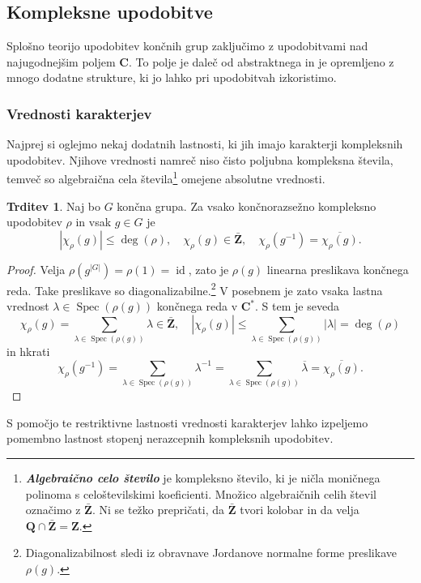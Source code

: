 \documentclass[11pt]{book}
\def\ZZ{\mathbf{Z}}
\def\QQ{\mathbf{Q}}
\def\CC{\mathbf{C}}
\DeclareMathOperator\Eigenvalues{Spec}
\DeclareMathOperator\id{id}
\def\definicija{\color{rdeca}\bf\em}
\theoremstyle{definition}
\theoremstyle{zgled}
\theoremstyle{odprtproblem}
\theoremstyle{domacanaloga}
\newenvironment{dokaz}
    {\color{siva}\begin{proof}}
    {\end{proof}}
\theoremstyle{izrek}
\newtheorem*{trditev}{Trditev}
\begin{document}
\subsection{Kompleksne upodobitve}

Splošno teorijo upodobitev končnih grup zaključimo z upodobitvami nad najugodnejšim poljem $\CC$. To polje je daleč od abstraktnega in je opremljeno z mnogo dodatne strukture, ki jo lahko pri upodobitvah izkoristimo.

\subsubsection{Vrednosti karakterjev}

Najprej si oglejmo nekaj dodatnih lastnosti, ki jih imajo karakterji kompleksnih upodobitev. Njihove vrednosti namreč niso čisto poljubna kompleksna števila, temveč so algebraična cela števila\footnote{{\definicija Algebraično celo število} je kompleksno število, ki je ničla moničnega polinoma s celoštevilskimi koeficienti. Množico algebraičnih celih števil označimo z $\bar{\ZZ}$. Ni se težko prepričati, da $\bar{\ZZ}$ tvori kolobar in da velja $\QQ \cap \bar{\ZZ} = \ZZ$.} omejene absolutne vrednosti. 

\begin{trditev}
Naj bo $G$ končna grupa. Za vsako končnorazsežno kompleksno upodobitev $\rho$ in vsak $g \in G$ je
\[
    |\chi_{\rho}(g)| \leq \deg(\rho), \quad
    \chi_{\rho}(g) \in \bar{\ZZ}, \quad
    \chi_{\rho}(g^{-1}) = \overline{\chi_{\rho}(g)}. 
\] 
\end{trditev}
\begin{dokaz}
Velja $\rho(g^{|G|}) = \rho(1) = \id$, zato je $\rho(g)$ linearna preslikava končnega reda. Take preslikave so diagonalizabilne.\footnote{Diagonalizabilnost sledi iz obravnave Jordanove normalne forme preslikave $\rho(g)$.} V posebnem je zato vsaka lastna vrednost $\lambda \in \Eigenvalues(\rho(g))$ končnega reda v $\CC^*$. S tem je seveda
\[
    \chi_{\rho}(g) = \sum_{\lambda \in \Eigenvalues(\rho(g))} \lambda \in \bar{\ZZ},
    \quad
    |\chi_{\rho}(g)| \leq \sum_{\lambda \in \Eigenvalues(\rho(g))} |\lambda| = \deg(\rho)
\]
in hkrati
\[
    \chi_{\rho}(g^{-1}) = \sum_{\lambda \in \Eigenvalues(\rho(g))} \lambda^{-1}
    = \sum_{\lambda \in \Eigenvalues(\rho(g))} \overline{\lambda}
    = \overline{\chi_{\rho}(g)}.
\]
\end{dokaz}

S pomočjo te restriktivne lastnosti vrednosti karakterjev lahko izpeljemo pomembno lastnost stopenj nerazcepnih kompleksnih upodobitev.
\end{document}
